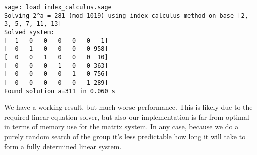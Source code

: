 \documentclass{article}
\begin{document}
\begin{verbatim}
sage: load index_calculus.sage
Solving 2^a = 281 (mod 1019) using index calculus method on base [2, 3, 5, 7, 11, 13]
Solved system:
[  1   0   0   0   0   0   1]
[  0   1   0   0   0   0 958]
[  0   0   1   0   0   0  10]
[  0   0   0   1   0   0 363]
[  0   0   0   0   1   0 756]
[  0   0   0   0   0   1 289]
Found solution a=311 in 0.060 s
\end{verbatim}

We have a working result, but much worse performance.
This is likely due to the required linear equation solver, but also our implementation is far from optimal in terms of memory use for the matrix system.
In any case, because we do a purely random search of the group it's less predictable how long it will take to form a fully determined linear system.
\end{document}
